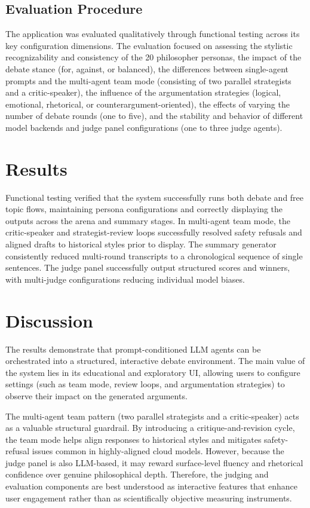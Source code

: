 \documentclass[11pt,a4paper]{article}
\begin{document}
\subsection{Evaluation Procedure}

The application was evaluated qualitatively through functional testing across its key configuration dimensions. The evaluation focused on assessing the stylistic recognizability and consistency of the 20 philosopher personas, the impact of the debate stance (for, against, or balanced), the differences between single-agent prompts and the multi-agent team mode (consisting of two parallel strategists and a critic-speaker), the influence of the argumentation strategies (logical, emotional, rhetorical, or counterargument-oriented), the effects of varying the number of debate rounds (one to five), and the stability and behavior of different model backends and judge panel configurations (one to three judge agents).

\section{Results}

Functional testing verified that the system successfully runs both debate and free topic flows, maintaining persona configurations and correctly displaying the outputs across the arena and summary stages. In multi-agent team mode, the critic-speaker and strategist-review loops successfully resolved safety refusals and aligned drafts to historical styles prior to display. The summary generator consistently reduced multi-round transcripts to a chronological sequence of single sentences. The judge panel successfully output structured scores and winners, with multi-judge configurations reducing individual model biases.

\section{Discussion}

The results demonstrate that prompt-conditioned LLM agents can be orchestrated into a structured, interactive debate environment. The main value of the system lies in its educational and exploratory UI, allowing users to configure settings (such as team mode, review loops, and argumentation strategies) to observe their impact on the generated arguments. 

The multi-agent team pattern (two parallel strategists and a critic-speaker) acts as a valuable structural guardrail. By introducing a critique-and-revision cycle, the team mode helps align responses to historical styles and mitigates safety-refusal issues common in highly-aligned cloud models. However, because the judge panel is also LLM-based, it may reward surface-level fluency and rhetorical confidence over genuine philosophical depth. Therefore, the judging and evaluation components are best understood as interactive features that enhance user engagement rather than as scientifically objective measuring instruments.
\end{document}
